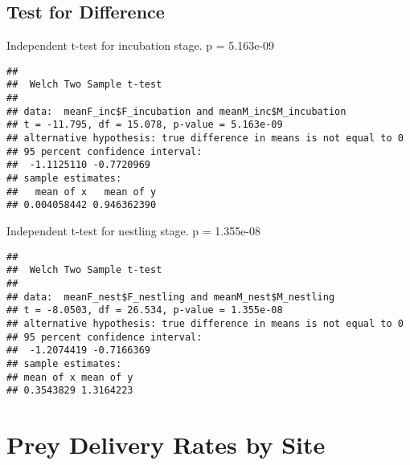 \documentclass[
]{article}
\newenvironment{Shaded}{\begin{snugshade}}{\end{snugshade}}
\newcommand{\FunctionTok}[1]{\textcolor[rgb]{0.00,0.00,0.00}{#1}}
\newcommand{\NormalTok}[1]{#1}
\newcommand{\SpecialCharTok}[1]{\textcolor[rgb]{0.00,0.00,0.00}{#1}}
\begin{document}
\hypertarget{test-for-difference}{%
\subsection{Test for Difference}\label{test-for-difference}}

Independent t-test for incubation stage. p = 5.163e-09

\begin{Shaded}
\end{Shaded}

\begin{verbatim}
## 
##  Welch Two Sample t-test
## 
## data:  meanF_inc$F_incubation and meanM_inc$M_incubation
## t = -11.795, df = 15.078, p-value = 5.163e-09
## alternative hypothesis: true difference in means is not equal to 0
## 95 percent confidence interval:
##  -1.1125110 -0.7720969
## sample estimates:
##   mean of x   mean of y 
## 0.004058442 0.946362390
\end{verbatim}

Independent t-test for nestling stage. p = 1.355e-08

\begin{Shaded}
\end{Shaded}

\begin{verbatim}
## 
##  Welch Two Sample t-test
## 
## data:  meanF_nest$F_nestling and meanM_nest$M_nestling
## t = -8.0503, df = 26.534, p-value = 1.355e-08
## alternative hypothesis: true difference in means is not equal to 0
## 95 percent confidence interval:
##  -1.2074419 -0.7166369
## sample estimates:
## mean of x mean of y 
## 0.3543829 1.3164223
\end{verbatim}

\hypertarget{prey-delivery-rates-by-site}{%
\section{Prey Delivery Rates by
Site}\label{prey-delivery-rates-by-site}}
\end{document}
